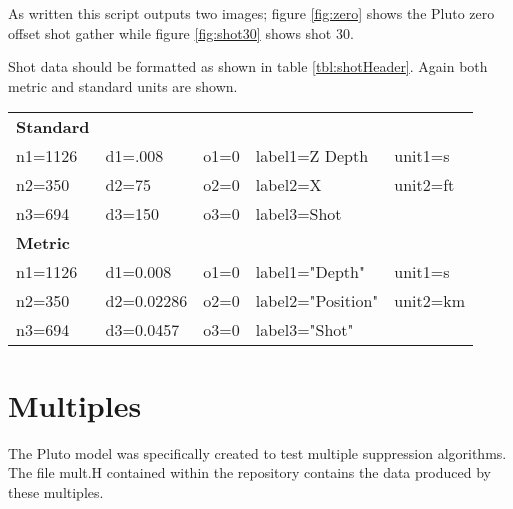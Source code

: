 As written this script outputs two images; figure \ref{fig:zero} shows the Pluto zero offset shot gather while figure \ref{fig:shot30} shows shot 30.  

{
\tiny

\normalsize
}



Shot data should be formatted as shown in table \ref{tbl:shotHeader}.  Again both metric and standard units are shown.  

{
\begin{tabular}[t]{|lllll|}
	\hline
	\textbf{Standard} &     &                       &                       &                \\
	n1=1126      &	    d1=.008	&   o1=0	&	label1=Z Depth	&	unit1=s  \\
	n2=350       &	    d2=75	&   o2=0	&	label2=X	&	unit2=ft \\
	n3=694       &	    d3=150	&   o3=0	&	label3=Shot 	&                \\
	\textbf{Metric}   &    		&               &                       &                \\
	    n1=1126  &      d1=0.008    &   o1=0        &	label1="Depth"  &	unit1=s  \\
	    n2=350   &      d2=0.02286  &   o2=0        &  	label2="Position" &	unit2=km \\
	    n3=694   &      d3=0.0457   &   o3=0        &  	label3="Shot"	&		 \\
	\hline
\end{tabular}
}

\section{Multiples}
The Pluto model was specifically created to test multiple suppression algorithms.  The file mult.H contained within the repository contains the data produced by these multiples.   


